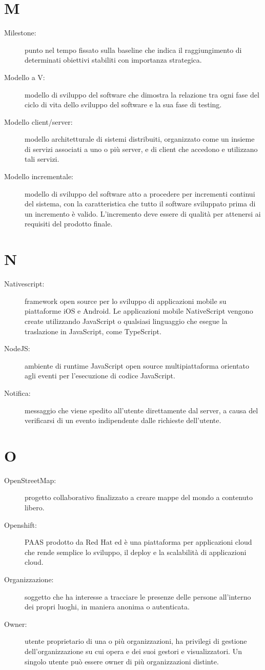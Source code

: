 \documentclass{article}
\begin{document}
\section{M}
\begin{description}
  \item[Milestone:] punto nel tempo fissato sulla baseline che indica il raggiungimento di determinati obiettivi stabiliti con importanza strategica.
  \item[Modello a V:] modello di sviluppo del software che dimostra la relazione tra ogni fase del ciclo di vita dello sviluppo del software e la sua fase di testing.
  \item[Modello client/server:] modello architetturale di sistemi distribuiti, organizzato come un insieme di servizi associati a uno o più server, e di client che accedono e utilizzano tali servizi.
  \item[Modello incrementale:] modello di sviluppo del software atto a procedere per incrementi continui del sistema, con la caratteristica che tutto il software sviluppato prima di un incremento è valido. L'incremento deve essere di qualità per attenersi ai requisiti del prodotto finale.
\end{description}
\newpage
\section{N}
\begin{description}
  \item[Nativescript:] framework open source per lo sviluppo di applicazioni mobile su piattaforme iOS e Android. Le applicazioni mobile NativeScript vengono create utilizzando JavaScript o qualsiasi linguaggio che esegue la traslazione in JavaScript, come TypeScript.
  \item[NodeJS:] ambiente di runtime JavaScript open source multipiattaforma orientato agli eventi per l'esecuzione di codice JavaScript.
  \item[Notifica:] messaggio che viene spedito all'utente direttamente dal server, a causa del verificarsi di un evento indipendente dalle richieste dell'utente.
\end{description}
\newpage
\section{O}
\begin{description}
  \item[OpenStreetMap:] progetto collaborativo finalizzato a creare mappe del mondo a contenuto libero.
  \item[Openshift:] PAAS prodotto da Red Hat ed è una piattaforma per applicazioni cloud che rende semplice lo sviluppo, il deploy e la scalabilità di applicazioni cloud.
  \item[Organizzazione:] soggetto che ha interesse a tracciare le presenze delle persone all'interno dei propri luoghi, in maniera anonima o autenticata.
  \item[Owner:] utente proprietario di una o più organizzazioni, ha privilegi di gestione dell'organizzazione su cui opera e dei suoi gestori e visualizzatori. Un singolo utente può essere owner di più organizzazioni distinte.
\end{description}
\newpage
\end{document}
